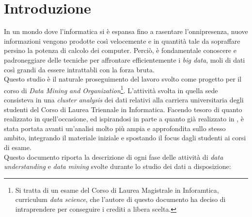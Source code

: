 \chapter{Introduzione}
\label{ch:intro}

In un mondo dove l'informatica si è espansa fino a rasentare l'onnipresenza, nuove informazioni vengono prodotte così velocemente e in quantità tale da sopraffare persino la potenza di calcolo dei computer. Perciò, è fondamentale conoscere e padroneggiare delle tecniche per affrontare efficientemente i \textit{big data}, moli di dati così grandi da essere intrattabli con la forza bruta. \\

Questo studio è il naturale proseguimento del lavoro svolto come progetto per il corso di \textit{Data Mining and Organization}\footnote{Si tratta di un esame del Corso di Laurea Magistrale in Inforamtica, curriculum \textit{data science}, che l'autore di questo documento ha deciso di intraprendere per conseguire i crediti a libera scelta.}. L'attività svolta in quella sede consisteva in una \textit{cluster analysis} dei dati relativi alla carriera universitaria degli studenti del Corso di Laurea Triennale in Informatica. Facendo tesoro di quanto realizzato in quell'occasione, ed ispirandosi in parte a quanto già realizzato in \cite{articolo}, è stata portata avanti un'analisi molto più ampia e approfondita sullo stesso ambito, integrando il materiale iniziale e spostando il focus dagli studenti ai corsi di esame. \\

Questo documento riporta la descrizione di ogni fase delle attività di \textit{data understanding} e \textit{data mining} svolte durante lo studio dei dati a disposizione:

